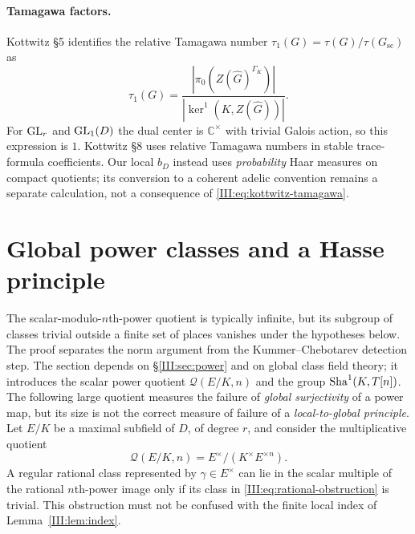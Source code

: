 \paragraph{Tamagawa factors.}
Kottwitz \S5 identifies the relative Tamagawa number
$\tau_1(G)=\tau(G)/\tau(G_{\mathrm{sc}})$ as
\begin{equation}\label{III:eq:kottwitz-tamagawa}
\tau_1(G)=
\frac{|\pi_0(Z(\widehat G)^{\Gamma_K})|}
{|\ker^1(K,Z(\widehat G))|}.
\end{equation}
For $\operatorname{GL}_r$ and $\operatorname{GL}_1(D)$ the dual center is
$\mathbb C^\times$ with trivial Galois action, so this expression
is $1$. Kottwitz \S8 uses relative Tamagawa numbers in stable
trace-formula coefficients. Our local $b_D$ instead uses
\emph{probability} Haar measures on compact quotients; its
conversion to a coherent adelic convention remains a separate
calculation, not a consequence of \eqref{III:eq:kottwitz-tamagawa}.

\section{Global power classes and a Hasse principle}\label{III:sec:global-power}
The scalar-modulo-$n$th-power quotient is typically infinite,
but its subgroup of classes trivial outside a finite set of places
vanishes under the hypotheses below. The proof separates the
norm argument from the Kummer--Chebotarev detection step. The section depends on \S\ref{III:sec:power} and on global class field theory; it introduces the scalar power quotient $\mathcal Q(E/K,n)$ and the group $\operatorname{Sha}^1(K,T[n])$.
The following large quotient measures the failure of \emph{global
surjectivity} of a power map, but its size is not the correct measure
of failure of a \emph{local-to-global principle}. Let $E/K$ be a maximal subfield
of $D$, of degree $r$, and consider the multiplicative quotient
\begin{equation}\label{III:eq:rational-obstruction}
\mathcal Q(E/K,n)=E^\times/(K^\times E^{\times n}).
\end{equation}
A regular rational class represented by $\gamma\in E^\times$
can lie in the scalar multiple of the rational $n$th-power image
only if its class in \eqref{III:eq:rational-obstruction} is trivial.
This obstruction must not be confused with the finite local index
of Lemma~\ref{III:lem:index}.

